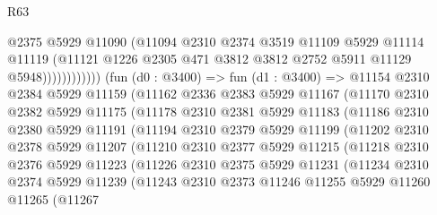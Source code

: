 \begin{lexlean}{R63}
\begin{coremodule}
                            @2375
                            @5929
                            @11090
                            (@11094
                              @2310
                              @2374
                              @3519
                              @11109
                              @5929
                              @11114
                              @11119
                              (@11121
                                @1226
                                @2305
                                @471
                                @3812
                                @3812
                                @2752
                                @5911
                                @11129
                                @5948))))))))))))
        (fun (d0 : @3400) =>
        fun (d1 : @3400) =>
        @11154
          @2310
          @2384
          @5929
          @11159
          (@11162
            @2336
            @2383
            @5929
            @11167
            (@11170
              @2310
              @2382
              @5929
              @11175
              (@11178
                @2310
                @2381
                @5929
                @11183
                (@11186
                  @2310
                  @2380
                  @5929
                  @11191
                  (@11194
                    @2310
                    @2379
                    @5929
                    @11199
                    (@11202
                      @2310
                      @2378
                      @5929
                      @11207
                      (@11210
                        @2310
                        @2377
                        @5929
                        @11215
                        (@11218
                          @2310
                          @2376
                          @5929
                          @11223
                          (@11226
                            @2310
                            @2375
                            @5929
                            @11231
                            (@11234
                              @2310
                              @2374
                              @5929
                              @11239
                              (@11243
                                @2310
                                @2373
                                @11246
                                @11255
                                @5929
                                @11260
                                @11265
                                (@11267

\end{coremodule}
\end{lexlean}

